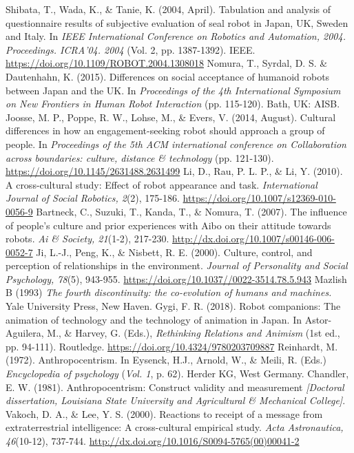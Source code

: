 \documentclass[a4j,12pt]{jreport}
\begin{document}
\begin{thebibliography}{999}
 Shibata, T., Wada, K., \& Tanie, K. (2004, April). Tabulation and analysis of questionnaire results of subjective evaluation of seal robot in Japan, UK, Sweden and Italy. In \textsl{IEEE International Conference on Robotics and Automation, 2004. Proceedings. ICRA'04. 2004} (Vol. 2, pp. 1387-1392). IEEE. \url{https://doi.org/10.1109/ROBOT.2004.1308018}
 Nomura, T., Syrdal, D. S. \& Dautenhahn, K. (2015). Differences on social acceptance of humanoid robots between Japan and the UK. In \textsl{Proceedings of the 4th International Symposium on New Frontiers in Human Robot Interaction} (pp. 115-120). Bath, UK: AISB.
 Joosse, M. P., Poppe, R. W., Lohse, M., \& Evers, V. (2014, August). Cultural differences in how an engagement-seeking robot should approach a group of people. In \textsl{Proceedings of the 5th ACM international conference on Collaboration across boundaries: culture, distance \& technology} (pp. 121-130). \url{https://doi.org/10.1145/2631488.2631499}
 Li, D., Rau, P. L. P., \& Li, Y. (2010). A cross-cultural study: Effect of robot appearance and task. \textsl{International Journal of Social Robotics, 2}(2), 175-186. \url{https://doi.org/10.1007/s12369-010-0056-9}
 Bartneck, C., Suzuki, T., Kanda, T., \& Nomura, T. (2007). The influence of people’s culture and prior experiences with Aibo on their attitude towards robots. \textsl{Ai \& Society, 21}(1-2), 217-230. \url{http://dx.doi.org/10.1007/s00146-006-0052-7}
 Ji, L.-J., Peng, K., \& Nisbett, R. E. (2000). Culture, control, and perception of relationships in the environment. \textsl{Journal of Personality and Social Psychology, 78}(5), 943-955. \url{https://doi.org/10.1037//0022-3514.78.5.943}
 Mazlish B (1993) \textsl{The fourth discontinuity: the co-evolution of humans and machines.} Yale University Press, New Haven.
 Gygi, F. R. (2018). Robot companions: The animation of technology and the technology of animation in Japan. In Astor-Aguilera, M., \& Harvey, G. (Eds.), \textsl{Rethinking Relations and Animism} (1st ed., pp. 94-111). Routledge. \url{https://doi.org/10.4324/9780203709887}
 Reinhardt, M. (1972). Anthropocentrism. In Eysenck, H.J., Arnold, W., \& Meili, R. (Eds.) \textsl{Encyclopedia of psychology} (\textsl{Vol. 1}, p. 62). Herder KG, West Germany.
 Chandler, E. W. (1981). Anthropocentrism: Construct validity and measurement \textsl{[Doctoral dissertation, Louisiana State University and Agricultural \& Mechanical College]}.
 Vakoch, D. A., \& Lee, Y. S. (2000). Reactions to receipt of a message from extraterrestrial intelligence: A cross-cultural empirical study. \textsl{Acta Astronautica, 46}(10-12), 737-744. \url{http://dx.doi.org/10.1016/S0094-5765(00)00041-2}

\end{thebibliography}
\end{document}
